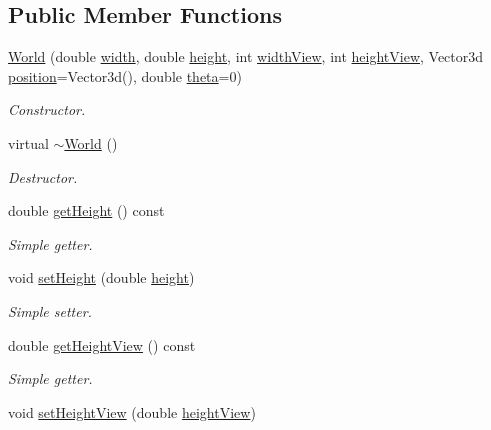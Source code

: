 \subsection*{Public Member Functions}
\begin{DoxyCompactItemize}
\item 
\hyperlink{classWorld_ae8ea8ff0609d5b37530b0a4adae065a7}{World} (double \hyperlink{classWorld_acbccb3a895843e63ed03d9a7f0ba04cf}{width}, double \hyperlink{classWorld_a5e0272d13155839a79169c4fddd2f9a4}{height}, int \hyperlink{classWorld_aa2de6ef451e67aac4bf028923083cd62}{width\+View}, int \hyperlink{classWorld_ae39d4731ecb9e398b60e410e137f860e}{height\+View}, Vector3d \hyperlink{classLocalizedObject_a340834deefc9e5c39da1f26c4ebf4f8c}{position}=Vector3d(), double \hyperlink{classLocalizedObject_aa5f7b070b6dc97a64a90797a0bca56e2}{theta}=0)
\begin{DoxyCompactList}\small\item\em Constructor. \end{DoxyCompactList}\item 
virtual \hyperlink{classWorld_a8c73fba541a5817fff65147ba47cd827}{$\sim$\+World} ()
\begin{DoxyCompactList}\small\item\em Destructor. \end{DoxyCompactList}\item 
double \hyperlink{classWorld_acc2f99cc48ee603c645c5fbd55762bb6}{get\+Height} () const 
\begin{DoxyCompactList}\small\item\em Simple getter. \end{DoxyCompactList}\item 
void \hyperlink{classWorld_a5d4ac723e964c5957f1bbd9e412e9bbe}{set\+Height} (double \hyperlink{classWorld_a5e0272d13155839a79169c4fddd2f9a4}{height})
\begin{DoxyCompactList}\small\item\em Simple setter. \end{DoxyCompactList}\item 
double \hyperlink{classWorld_ace9245fcf22b906eb1dd1e18e823d9cd}{get\+Height\+View} () const 
\begin{DoxyCompactList}\small\item\em Simple getter. \end{DoxyCompactList}\item 
void \hyperlink{classWorld_ab827fe0d14a6f60fe18e2ed5ee92d328}{set\+Height\+View} (double \hyperlink{classWorld_ae39d4731ecb9e398b60e410e137f860e}{height\+View})

\end{DoxyCompactItemize}
